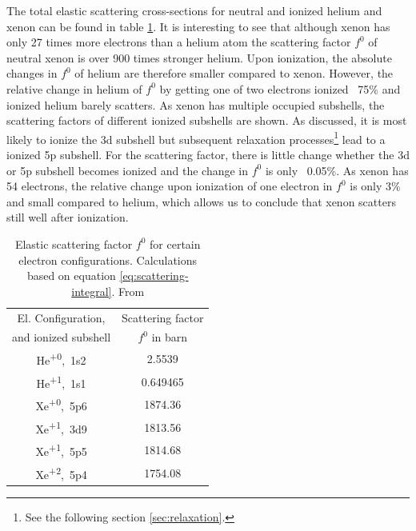 The total elastic scattering cross-sections for neutral and ionized helium and xenon can be found in table \ref{tab:helium-xenon-el-scattering-crossection}. It is interesting to see that although xenon has only 27 times more electrons than a helium atom the scattering factor $f^{0}$ of neutral xenon is over 900 times stronger helium. Upon ionization, the absolute changes in $f^{0}$ of helium are therefore smaller compared to xenon. However, the relative change in helium of $f^{0}$ by getting one of two electrons ionized ~75\% and ionized helium barely scatters. As xenon has multiple occupied subshells, the scattering factors of different ionized subshells are shown. As discussed, it is most likely to ionize the 3d subshell but subsequent relaxation processes\footnote{See the following section \ref{sec:relaxation}.} lead to a ionized 5p subshell. For the scattering factor, there is little change whether the 3d or 5p subshell becomes ionized and the change in $f^{0}$ is only ~0.05\%. As xenon has 54 electrons, the relative change upon ionization of one electron in $f^{0}$ is only 3\% and small compared to helium, which allows us to conclude that xenon scatters still well after ionization.  
\begin{table}
	\centering
		\begin{tabular}{ | c | c | }
		\hline
			El. Configuration, & Scattering factor \\
			and ionized subshell & $f^{0}$ in barn \\ \hline
			He\textsuperscript{+0},\ 1s2 & 2.5539  \\ \hline
			He\textsuperscript{+1},\ 1s1 & 0.649465  \\ \hline
			Xe\textsuperscript{+0},\ 5p6 & 1874.36  \\ \hline
			Xe\textsuperscript{+1},\ 3d9 & 1813.56  \\ \hline
			Xe\textsuperscript{+1},\ 5p5 & 1814.68  \\ \hline
			Xe\textsuperscript{+2},\ 5p4 & 1754.08  \\ \hline
		\end{tabular}
	\caption[Elastic scattering factors for helium and xenon.]{Elastic scattering factor $f^{0}$ for certain electron configurations. Calculations based on equation \eqref{eq:scattering-integral}. From \cite{Ho-2016-PC}}
	\label{tab:helium-xenon-el-scattering-crossection}
\end{table}
